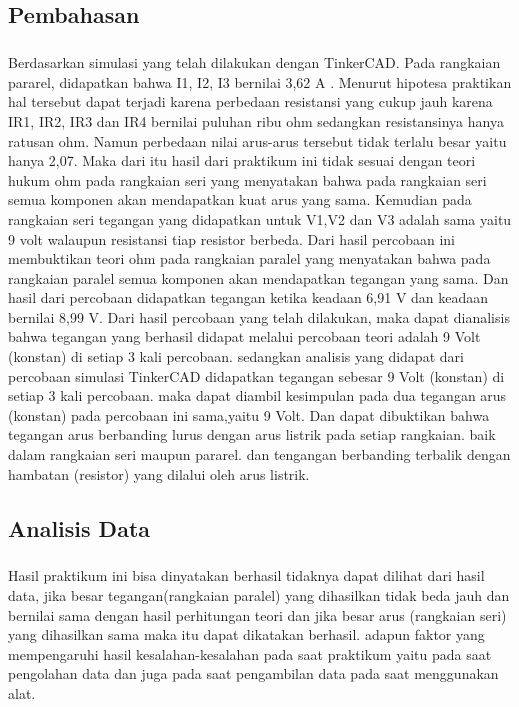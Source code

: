 \documentclass[12pt,a4paper]{article}
\begin{document}
\newpage
\subsection{Pembahasan}
\subparagraph{}
	Berdasarkan simulasi yang telah dilakukan dengan TinkerCAD. Pada rangkaian pararel, didapatkan bahwa I1, I2, I3 bernilai 3,62 A . Menurut hipotesa praktikan hal tersebut dapat terjadi karena perbedaan resistansi yang cukup jauh karena IR1, IR2, IR3 dan IR4 bernilai puluhan ribu ohm sedangkan resistansinya hanya ratusan ohm. Namun perbedaan nilai arus-arus tersebut tidak terlalu besar yaitu hanya 2,07. Maka dari itu hasil dari praktikum ini tidak sesuai dengan teori hukum ohm pada rangkaian seri yang menyatakan bahwa pada rangkaian seri semua komponen akan mendapatkan kuat arus yang sama.
Kemudian pada rangkaian seri tegangan yang didapatkan untuk V1,V2 dan V3 adalah sama yaitu 9 volt walaupun resistansi tiap resistor berbeda. Dari hasil percobaan ini membuktikan teori ohm pada rangkaian paralel yang menyatakan bahwa pada rangkaian paralel semua komponen akan mendapatkan tegangan yang sama. Dan hasil dari percobaan didapatkan tegangan ketika keadaan 6,91 V dan keadaan bernilai 8,99 V.
	Dari hasil percobaan yang telah dilakukan, maka dapat dianalisis bahwa tegangan yang berhasil didapat melalui percobaan teori adalah 9 Volt (konstan) di setiap 3 kali percobaan. sedangkan analisis yang didapat dari percobaan simulasi TinkerCAD didapatkan tegangan sebesar 9 Volt (konstan) di setiap 3 kali percobaan. maka dapat diambil kesimpulan pada dua tegangan arus (konstan) pada percobaan ini sama,yaitu 9 Volt. Dan dapat dibuktikan bahwa tegangan arus berbanding lurus dengan arus listrik pada setiap rangkaian. baik dalam rangkaian seri maupun pararel. dan tengangan berbanding terbalik dengan hambatan (resistor) yang dilalui oleh arus listrik.

\newpage
\subsection{Analisis Data}
\subparagraph{}
	Hasil praktikum ini bisa dinyatakan berhasil tidaknya dapat dilihat dari hasil data, jika besar tegangan(rangkaian paralel) yang dihasilkan tidak beda jauh dan bernilai sama dengan hasil perhitungan teori dan jika besar arus (rangkaian seri) yang dihasilkan sama maka itu dapat dikatakan berhasil. adapun faktor yang mempengaruhi hasil kesalahan-kesalahan pada saat praktikum yaitu pada saat pengolahan data dan juga pada saat pengambilan data pada saat menggunakan alat.
\end{document}
